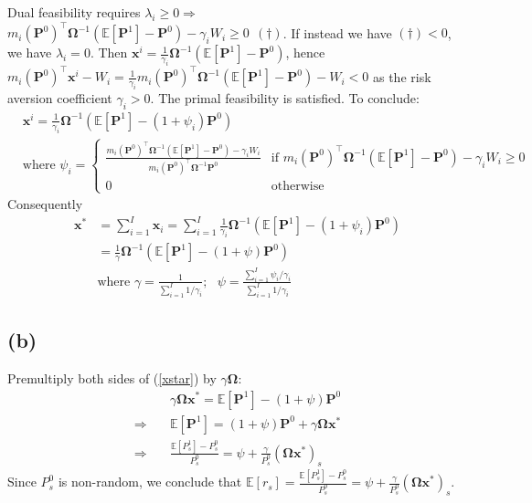 \documentclass[10pt]{article}
\begin{document}
Dual feasibility requires $\lambda_i \geq 0 \Rightarrow$ $m_i (\bm{P}^0)^{\top}\bm{\Omega}^{-1}\left(\mathbb{E}\left[\bm{P}^1\right] - \bm{P}^0\right) - \gamma_i W_i \geq 0~~(\dagger)$. If instead we have $(\dagger)<0$, we have $\lambda_i = 0$. Then $\bm{x}^i = \frac{1}{\gamma_i}\bm{\Omega}^{-1}\left(\mathbb{E}\left[\bm{P}^1\right] - \bm{P}^0\right)$, hence $m_i (\bm{P}^0)^{\top} \bm{x}^i - W_i =\frac{1}{\gamma_i} m_i (\bm{P}^0)^{\top}\bm{\Omega}^{-1}\left(\mathbb{E}\left[\bm{P}^1\right] - \bm{P}^0\right) -  W_i < 0$ as the risk aversion coefficient $\gamma_i > 0$. The primal feasibility is satisfied. To conclude:
\begin{equation}
  \begin{split}\label{psii}
  &\bm{x}^i = \frac{1}{\gamma_i}\bm{\Omega}^{-1}\left(\mathbb{E}\left[\bm{P}^1\right] - (1+\psi_i)\bm{P}^0\right) \\
  &\text{where }\psi_i = 
  \begin{cases}
  \frac{m_i (\bm{P}^0)^{\top}\bm{\Omega}^{-1}\left(\mathbb{E}\left[\bm{P}^1\right] - \bm{P}^0\right) - \gamma_i W_i}{m_i (\bm{P}^0)^{\top}\bm{\Omega}^{-1} \bm{P}^0} & \text{if } m_i (\bm{P}^0)^{\top}\bm{\Omega}^{-1}\left(\mathbb{E}\left[\bm{P}^1\right] - \bm{P}^0\right) - \gamma_i W_i \geq 0 \\
  0 & \text{otherwise}
  \end{cases}
  \end{split}
\end{equation}
Consequently
\begin{equation}\label{xstar}
  \begin{split}
    \bm{x}^* &= \sum_{i=1}^I \bm{x}_i = \sum_{i=1}^I\frac{1}{\gamma_i}\bm{\Omega}^{-1}\left(\mathbb{E}\left[\bm{P}^1\right] - (1+\psi_i)\bm{P}^0\right) \\
    &=\frac{1}{\gamma}\bm{\Omega}^{-1}\left(\mathbb{E}\left[\bm{P}^1\right] - (1+\psi)\bm{P}^0\right)\\
    &\text{where } \gamma = \frac{1}{\sum_{i=1}^I 1/\gamma_i};~~~\psi = \frac{\sum_{i=1}^I \psi_i/\gamma_i}{\sum_{i=1}^I 1/\gamma_i}
  \end{split}
\end{equation}
\subsection{(b)} 
Premultiply both sides of (\ref{xstar}) by $\gamma \bm{\Omega}$:
\begin{equation}
  \begin{split}
    &\gamma \bm{\Omega}\bm{x}^* = \mathbb{E}\left[\bm{P}^1\right] - (1+\psi)\bm{P}^0 \\
    \Rightarrow\quad & \mathbb{E}\left[\bm{P}^1\right] = (1+\psi)\bm{P}^0 + \gamma \bm{\Omega}\bm{x}^* \\
    \Rightarrow \quad &\frac{\mathbb{E}\left[P^1_s\right]-P^0_s}{P^0_s} = \psi + \frac{\gamma}{P_s^0} (\bm{\Omega}\bm{x}^*)_s
  \end{split}
\end{equation}
Since $P_s^0$ is non-random, we conclude that $\mathbb{E}\left[r_s\right] = \frac{\mathbb{E}\left[P^1_s\right]-P^0_s}{P^0_s} = \psi + \frac{\gamma}{P_s^0} (\bm{\Omega}\bm{x}^*)_s$.
\end{document}
